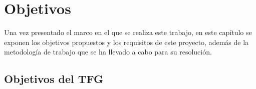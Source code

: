 \documentclass{report}
\begin{document}


\chapter{Objetivos}

Una vez presentado el marco en el que se realiza este trabajo, en este capítulo se exponen los objetivos propuestos y los requisitos de este proyecto, además de la metodología de trabajo que se ha llevado a cabo para su resolución.

\section{Objetivos del TFG}
\end{document}
